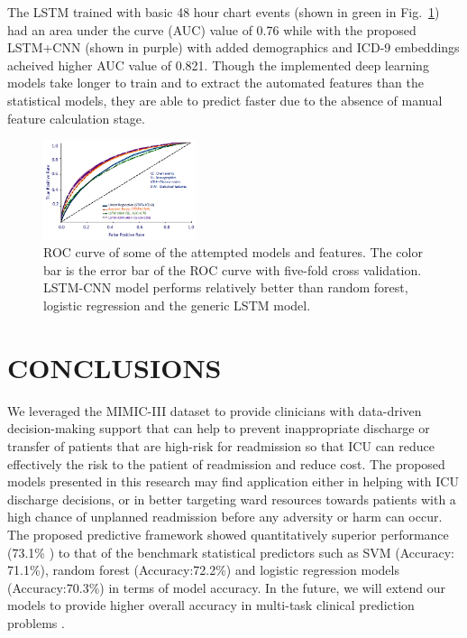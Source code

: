 \documentclass[letterpaper, 10pt, conference]{ieeeconf} %
\newcommand{\fig}[1]{Fig.~\ref{#1}}
\begin{document}
The LSTM trained with basic 48 hour chart events (shown in green in \fig{fig:roc})  had an area under the curve (AUC) value of 0.76 while with the proposed LSTM+CNN (shown in purple) with added demographics and ICD-9 embeddings acheived higher AUC value of 0.821. Though the implemented deep learning models take longer to train and to extract the automated features than the statistical models, they are able to predict faster due to the absence of manual feature calculation stage.

\begin{figure}[h!]
  \centering
  \includegraphics[width=0.40\textwidth]{Figures/mimic3_RoC.png}
\caption{ROC curve of some of the attempted models and features. The color bar is the error bar of the ROC curve with five-fold cross validation. LSTM-CNN model performs relatively better than random forest, logistic regression and the generic LSTM model. }
\label{fig:roc}
\end{figure}





 
\section{CONCLUSIONS} \label{sec:conclusions}

 We leveraged the MIMIC-III dataset to provide clinicians with data-driven decision-making support that can help to prevent inappropriate discharge or transfer of patients that are high-risk for readmission so that ICU can reduce effectively the risk to the patient of readmission and reduce cost. The proposed  models  presented in this research may find application either in helping with ICU discharge decisions, or in better targeting ward resources towards patients with a high chance of unplanned readmission before any adversity or harm can occur. The proposed predictive framework showed quantitatively superior performance (73.1\% ) to that of the benchmark statistical predictors such as SVM (Accuracy: 71.1\%), random forest (Accuracy:72.2\%) and logistic regression models (Accuracy:70.3\%) in terms of model accuracy. In the future, we will extend our models to provide higher overall accuracy in multi-task clinical prediction problems \cite{harutyunyan2017multitask}.
\end{document}
